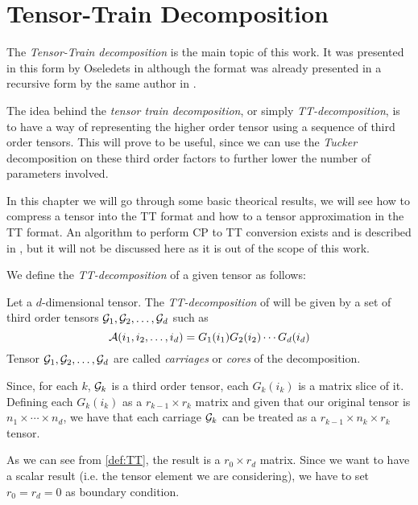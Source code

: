 \chapter{Tensor-Train Decomposition}

The \emph{Tensor-Train decomposition} is the main topic of this work. It was presented in this form by Oseledets in \cite{oseledets2011tt} although the format was already presented in a recursive form by the same author in \cite{oseledetstyrty2009}.

The idea behind the \emph{tensor train decomposition}, or simply \emph{TT-decomposition}, is to have a way of representing the higher order tensor using a sequence of third order tensors. This will prove to be useful, since we can use the \emph{Tucker} decomposition on these third order factors to further lower the number of parameters involved.

In this chapter we will go through some basic theorical results, we will see how to compress a  tensor into the TT format and how to  a tensor approximation in the TT format. An algorithm to perform CP to TT conversion exists and is described in \cite{oseledets2011tt}, but it will not be discussed here as it is out of the scope of this work.

We define the \emph{TT-decomposition} of a given tensor \A as follows:

\begin{Def}
  Let \A a $d$-dimensional tensor. The \emph{TT-decomposition} of \A will be given by a set of third order tensors $\mathcal{G}_1,\mathcal{G}_2,\dots,\mathcal{G}_d$ such as
  \begin{equation} \label{def:TT}
    \mathcal{A}(i_1,i_2,\dots,i_d) = G_1(i_1)G_2(i_2)\cdots G_d(i_d)
  \end{equation}
  Tensor $\mathcal{G}_1,\mathcal{G}_2,\dots,\mathcal{G}_d$ are called \emph{carriages} or \emph{cores} of the decomposition.
\end{Def}

Since, for each $k$, $\mathcal{G}_k$ is a third order tensor, each $G_k(i_k)$ is a matrix slice of it. Defining each $G_k(i_k)$ as a $r_{k-1} \times r_k$ matrix and given that our original tensor \A is $n_1 \times \cdots \times n_d$, we have that each carriage $\mathcal{G}_k$ can be treated as a $r_{k-1} \times n_k \times r_k$ tensor.

As we can see from \ref{def:TT}, the result is a $r_0 \times r_d$ matrix. Since we want to have a scalar result (i.e. the tensor element we are considering), we have to set $r_0 = r_d = 0$ as boundary condition.

